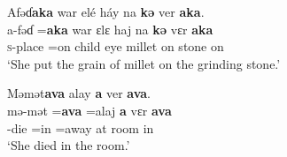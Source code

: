 \ea \label{ex:5:142}
Afəɗ\textbf{aka}  war  elé  háy  na  \textbf{kə}  ver  \textbf{aka}.\\
\gll  a-fəɗ =\textbf{aka}  war  ɛlɛ  haj  na  \textbf{kə}  vɛr  \textbf{aka}\\
      \textsc{s}-place  =on  child  eye  millet  {\PSP}  on  stone  on\\
\glt  ‘She put the grain of millet on the grinding stone.’
\z


\ea \label{ex:5:143}
Məmət\textbf{ava}  alay  \textbf{a}  ver  \textbf{ava}.\\
\gll  mə-mət  =\textbf{ava} =alaj  \textbf{a}   vɛr   \textbf{ava}\\
      {\NOM}{}-die  =in  =away  at  room  in\\
\glt  ‘She died in the room.’  
\z